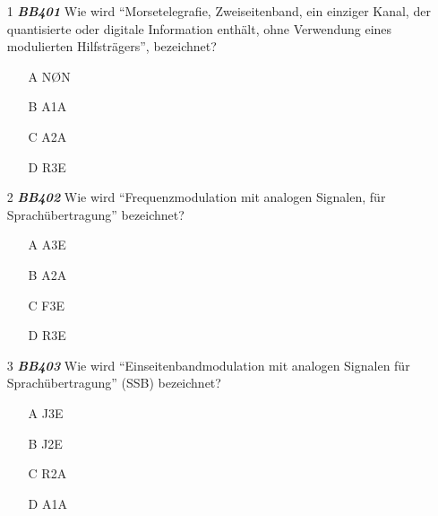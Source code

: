 \begin{enumerate} 
	\item[1] \emph{\textbf{BB401}}  Wie wird ``Morsetelegrafie, Zweiseitenband, ein einziger Kanal, der quantisierte oder digitale Information enthält, ohne Verwendung eines modulierten Hilfsträgers'', bezeichnet?
	\begin{enumerate}
	\itemsep1pt\parskip0pt
		\item[A] NØN
		\item[B] A1A
		\item[C] A2A
		\item[D] R3E
	\end{enumerate} 
	\item[2] \emph{\textbf{BB402}}  Wie wird ``Frequenzmodulation mit analogen Signalen, für Sprachübertragung'' bezeichnet?
	\begin{enumerate}
	\itemsep1pt\parskip0pt
		\item[A] A3E
		\item[B] A2A
		\item[C] F3E
		\item[D] R3E
	\end{enumerate} 
	\item[3] \emph{\textbf{BB403}}  Wie wird ``Einseitenbandmodulation mit analogen Signalen für Sprachübertragung'' (SSB) bezeichnet?
	\begin{enumerate}
	\itemsep1pt\parskip0pt
		\item[A] J3E
		\item[B] J2E
		\item[C] R2A
		\item[D] A1A
	\end{enumerate} 
\end{enumerate}

